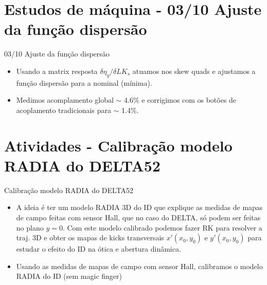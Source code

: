 \documentclass{beamer}					%
\begin{document}
\section{Estudos de máquina - 03/10 Ajuste da função dispersão}

\begin{frame}{03/10 Ajuste da função dispersão}
    \begin{itemize}
		\item Usando a matrix resposta $\delta \eta_y / \delta LK_s$ atuamos nos skew quads e ajustamos a função dispersão para a nominal (mínima).
        \item Medimos acomplamento global $\sim$ 4.6\% e corrigimos com os botões de acoplamento tradicionais para $\sim$ 1.4\%.
	\end{itemize}
\end{frame}


        

\section{Atividades - Calibração modelo RADIA do DELTA52}

\begin{frame}{Calibração modelo RADIA do DELTA52}
    \begin{itemize}
		\item A ideia é ter um modelo RADIA 3D do ID que explique as medidas de mapas de campo feitas com sensor Hall, que no caso do DELTA, só podem ser feitas no plano $y = 0$. Com este modelo calibrado podemos fazer RK para resolver a traj. 3D e obter os mapas de kicks transversais $x'(x_0, y_0)$ e $y'(x_0, y_0)$ para estudar o efeito do ID na ótica e abertura dinâmica.
        \item Usando as medidas de mapas de campo com sensor Hall, calibramos o modelo RADIA do ID (sem magic finger)
	\end{itemize}
\end{frame}
\end{document}
